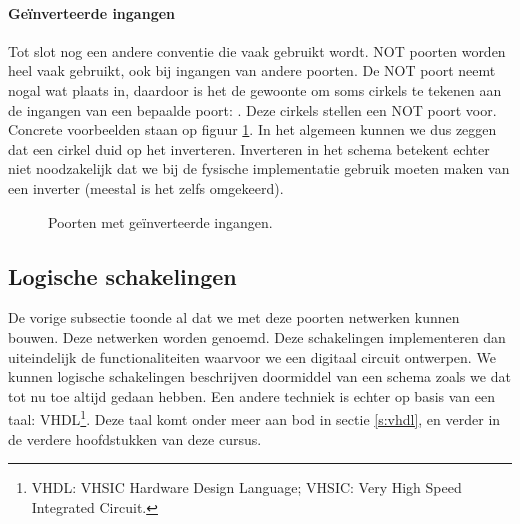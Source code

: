 \paragraph{Ge\"inverteerde ingangen}Tot slot nog een andere conventie die vaak gebruikt wordt. NOT poorten worden heel vaak gebruikt, ook bij ingangen van andere poorten. De NOT poort neemt nogal wat plaats in, daardoor is het de gewoonte om soms cirkels te tekenen aan de ingangen van een bepaalde poort: . Deze cirkels stellen een NOT poort voor. Concrete voorbeelden staan op figuur \ref{fig:basicGatesInvertedInput}. In het algemeen kunnen we dus zeggen dat een cirkel duid op het inverteren. Inverteren in het schema betekent echter niet noodzakelijk dat we bij de fysische implementatie gebruik moeten maken van een inverter (meestal is het zelfs omgekeerd).
\begin{figure}[htb]
\centering
{}
\caption{Poorten met ge\"inverteerde ingangen.}
\label{fig:basicGatesInvertedInput}
\end{figure}
\subsection{Logische schakelingen}
De vorige subsectie toonde al dat we met deze poorten netwerken kunnen bouwen. Deze netwerken worden  genoemd. Deze schakelingen implementeren dan uiteindelijk de functionaliteiten waarvoor we een digitaal circuit ontwerpen. We kunnen logische schakelingen beschrijven doormiddel van een schema zoals we dat tot nu toe altijd gedaan hebben. Een andere techniek is echter op basis van een taal: VHDL\footnote{VHDL: VHSIC Hardware Design Language; VHSIC: Very High Speed Integrated Circuit.}. Deze taal komt onder meer aan bod in sectie \ref{s:vhdl}, en verder in de verdere hoofdstukken van deze cursus.
